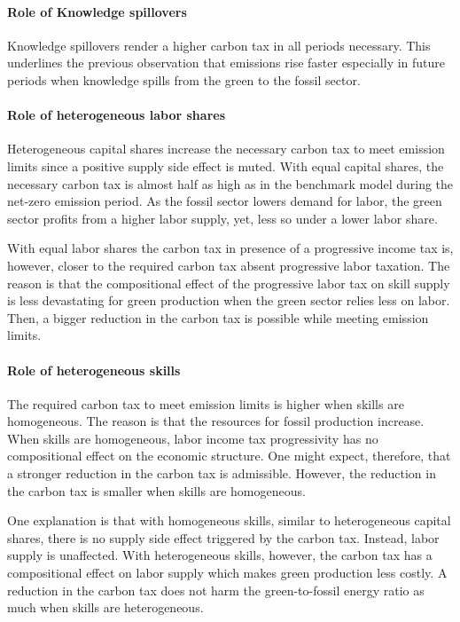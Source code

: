 \paragraph{Role of Knowledge spillovers}
Knowledge spillovers render a higher carbon tax in all periods necessary. This underlines the previous observation that emissions rise faster especially in future periods when knowledge spills from the green to the fossil sector.

\paragraph{Role of heterogeneous labor shares}
Heterogeneous capital shares increase the necessary carbon tax to meet emission limits since a positive supply side effect is muted. 
With equal capital shares, the necessary carbon tax is almost half as high as in the benchmark model during the net-zero emission period. 
As the fossil sector lowers demand for labor, the green sector profits from a higher labor supply, yet, less so under a lower labor share.  

With equal labor shares the carbon tax in presence of a progressive income tax is, however, closer to the required carbon tax absent progressive labor taxation.  The reason is that the compositional effect of the  progressive labor tax on skill supply is less devastating for green production when the green sector relies less on labor. Then, a bigger reduction in the carbon tax is possible while meeting emission limits. 

\paragraph{Role of heterogeneous skills}

The required carbon tax to meet emission limits is higher when skills are homogeneous. The reason is that the resources for fossil production increase.
When skills are homogeneous, labor income tax progressivity has no compositional effect on the economic structure. One might expect, therefore, that a stronger reduction in the carbon tax is admissible. However, the reduction in the carbon tax is smaller when skills are homogeneous. 

One explanation is that with homogeneous skills, similar to heterogeneous capital shares, there is no supply side effect triggered by the carbon tax. Instead, labor supply is unaffected. With heterogeneous skills, however, the carbon tax has a compositional effect on labor supply which makes green production less costly. A reduction in the carbon tax does not harm the green-to-fossil energy ratio as much when skills are heterogeneous. 

